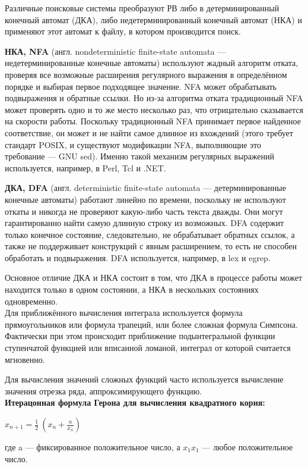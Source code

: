 \documentclass[12pt, a4paper]{article}
\begin{document}
Различные поисковые системы преобразуют РВ либо в детерминированный конечный автомат (ДКА), либо недетерминированный конечный автомат (НКА) и применяют этот автомат к файлу, в котором производится поиск.

\textbf{НКА, NFA} (англ. nondeterministic finite-state automata — недетерминированные конечные автоматы) используют жадный алгоритм отката, проверяя все возможные расширения регулярного выражения в определённом порядке и выбирая первое подходящее значение. NFA может обрабатывать подвыражения и обратные ссылки. Но из-за алгоритма отката традиционный NFA может проверять одно и то же место несколько раз, что отрицательно сказывается на скорости работы. Поскольку традиционный NFA принимает первое найденное соответствие, он может и не найти самое длинное из вхождений (этого требует стандарт POSIX, и существуют модификации NFA, выполняющие это требование — GNU sed). Именно такой механизм регулярных выражений используется, например, в Perl, Tcl и .NET.

\textbf{ДКА, DFA} (англ. deterministic finite-state automata — детерминированные конечные автоматы) работают линейно по времени, поскольку не используют откаты и никогда не проверяют какую-либо часть текста дважды. Они могут гарантированно найти самую длинную строку из возможных. DFA содержит только конечное состояние, следовательно, не обрабатывает обратных ссылок, а также не поддерживает конструкций с явным расширением, то есть не способен обработать и подвыражения. DFA используется, например, в lex и egrep.

Основное отличие ДКА и НКА состоит в том, что ДКА в процессе работы может находится только в одном состоянии, а НКА в нескольких состояниях одновременно.\\

Для приближённого вычисления интеграла используется формула прямоугольников или формула трапеций, или более сложная формула Симпсона. Фактически при этом происходит приближение подынтегральной функции ступенчатой функцией или вписанной ломаной, интеграл от которой считается мгновенно.

Для вычисления значений сложных функций часто используется вычисление значения отрезка ряда, аппроксимирующего функцию.\\

\textbf{Итерацонная формула Герона для вычисления квадратного корня: }

$x_{n+1}={\frac {1}{2}}~\left(x_{n}+{\frac {a}{x_{n}}}\right)$

где a — фиксированное положительное число, а ${\displaystyle x_{1}} x_{1}$ — любое положительное число.
\end{document}
